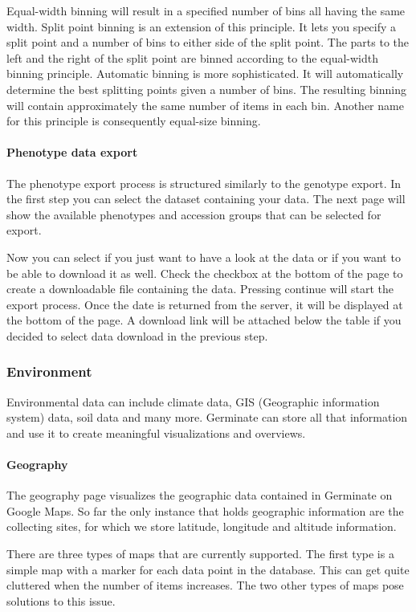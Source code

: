 Equal-width binning will result in a specified number of bins all having the same width. Split point binning is an extension of this principle. It lets you specify a split point and a number of bins to either side of the split point. The parts to the left and the right of the split point are binned according to the equal-width binning principle. Automatic binning is more sophisticated. It will automatically determine the best splitting points given a number of bins. The resulting binning will contain approximately the same number of items in each bin. Another name for this principle is consequently equal-size binning.

\paragraph{Phenotype data export}
The phenotype export process is structured similarly to the genotype export. In the first step you can select the dataset containing your data. The next page will show the available phenotypes and accession groups that can be selected for export.

Now you can select if you just want to have a look at the data or if you want to be able to download it as well. Check the checkbox at the bottom of the page to create a downloadable file containing the data. Pressing continue will start the export process. Once the date is returned from the server, it will be displayed at the bottom of the page. A download link will be attached below the table if you decided to select data download in the previous step.

\subsubsection{Environment}
Environmental data can include climate data, GIS (Geographic information system) data, soil data and many more. Germinate can store all that information and use it to create meaningful visualizations and overviews.

\paragraph{Geography}
The geography page visualizes the geographic data contained in Germinate on Google Maps. So far the only instance that holds geographic information are the collecting sites, for which we store latitude, longitude and altitude information.

There are three types of maps that are currently supported. The first type is a simple map with a marker for each data point in the database. This can get quite cluttered when the number of items increases. The two other types of maps pose solutions to this issue.

